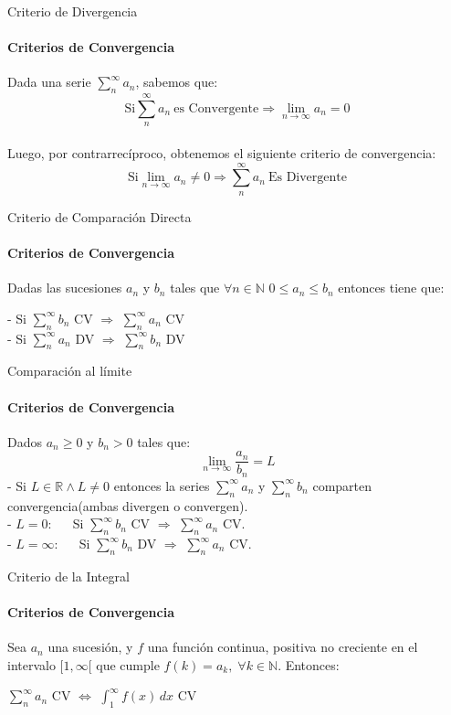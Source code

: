 \documentclass{plantillaPPT}
\begin{document}
\primeraDiapo

\begin{frame}{Criterio de Divergencia}
\framesubtitle{Criterios de Convergencia}

Dada una serie \(\displaystyle\sum_{n}^{\infty}a_n\), sabemos que:\\[2ex]
\[\text{Si} \sum_{n}^{\infty}a_n\ \text{es Convergente} \Rightarrow \lim_{n\to\infty}a_n = 0\]\\[2ex]
Luego, por contrarrecíproco, obtenemos el siguiente criterio de convergencia:
\[\text{Si} \lim_{n\to\infty}a_n \neq 0 \Rightarrow \sum_{n}^{\infty}a_n\ \text{Es Divergente}\]
    
\end{frame}

\begin{frame}{Criterio de Comparación Directa}
\framesubtitle{Criterios de Convergencia}

Dadas las sucesiones \(a_n\) y \(b_n\) tales que \(\forall n\in\mathbb{N}\) \(0\leq a_n\leq b_n\) entonces tiene que:\\[3ex]
\begin{center}
- Si \(\displaystyle\sum_{n}^\infty b_n\) CV \(\Rightarrow\) \(\displaystyle\sum_{n}^\infty a_n\) CV\\[3ex]
- Si \(\displaystyle\sum_{n}^\infty a_n\) DV \(\Rightarrow\) \(\displaystyle\sum_{n}^\infty b_n\) DV
\end{center}
    
\end{frame}

\begin{frame}{Comparación al límite}
\framesubtitle{Criterios de Convergencia}

Dados \(a_n \geq 0\) y \(b_n>0\) tales que:
\[\lim_{n\to\infty}\frac{a_n}{b_n}=L\]
- Si \(L\in\mathbb{R} \land L\neq0\) entonces la series \(\displaystyle\sum_{n}^{\infty}a_n\) y \(\displaystyle\sum_{n}^{\infty}b_n\) comparten convergencia(ambas divergen o convergen).\\[2ex]
- \(L = 0\): \(\quad\) Si \(\displaystyle\sum_{n}^{\infty}b_n\) CV \(\Rightarrow\) \(\displaystyle\sum_{n}^{\infty}a_n\) CV. \\[2ex]
- \(L = \infty\): \(\quad\) Si \(\displaystyle\sum_{n}^{\infty}b_n\) DV \(\Rightarrow\) \(\displaystyle\sum_{n}^{\infty}a_n\) CV.

\end{frame}

\begin{frame}{Criterio de la Integral}
\framesubtitle{Criterios de Convergencia}

Sea \(a_n\) una sucesión, y \(f\) una función continua, positiva no creciente en el intervalo \([1,\infty[\) que cumple \(f(k) = a_k, \; \forall k\in\mathbb{N}\). Entonces:\\[4ex]
\begin{center}
\(\displaystyle\sum_{n}^{\infty}a_n\) CV \(\Longleftrightarrow\) \(\displaystyle\int_1^{\infty}f(x)\,dx\) CV
\end{center}
\end{frame}
\end{document}
